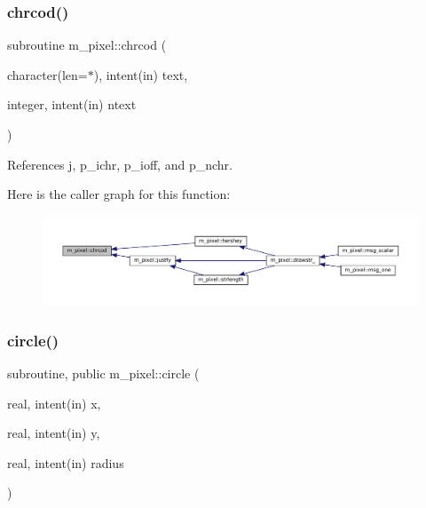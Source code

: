 \mbox{\label{namespacem__pixel_ab25c6cce708ff91a79bbabb23d591a8b}} 
\subsubsection{\texorpdfstring{chrcod()}{chrcod()}}
{\footnotesize\ttfamily subroutine m\+\_\+pixel\+::chrcod (\begin{DoxyParamCaption}\item[{character(len=$\ast$), intent(in)}]{text,  }\item[{integer, intent(in)}]{ntext }\end{DoxyParamCaption})\hspace{0.3cm}{\ttfamily [private]}}



References j, p\+\_\+ichr, p\+\_\+ioff, and p\+\_\+nchr.

Here is the caller graph for this function\+:
\nopagebreak
\begin{figure}[H]
\begin{center}
\leavevmode
\includegraphics[width=350pt]{namespacem__pixel_ab25c6cce708ff91a79bbabb23d591a8b_icgraph}
\end{center}
\end{figure}
\mbox{\label{namespacem__pixel_ab3b12cc498ed490014aa5fcc0bb278d2}} 
\subsubsection{\texorpdfstring{circle()}{circle()}}
{\footnotesize\ttfamily subroutine, public m\+\_\+pixel\+::circle (\begin{DoxyParamCaption}\item[{real, intent(in)}]{x,  }\item[{real, intent(in)}]{y,  }\item[{real, intent(in)}]{radius }\end{DoxyParamCaption})}



